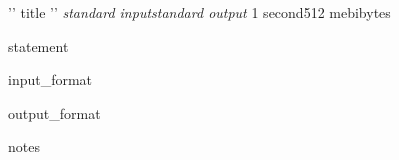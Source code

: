 \begin{problem}{{ '{' }}{{ title }}{{ '}' }}
{\textsl{standard input}}{\textsl{standard output}}
{1 second}{512 mebibytes}{}

{{ statement }}

\InputFile

{{ input_format }}

\OutputFile

{{ output_format }}

\Examples

\begin{example}\end{example}

{{ notes }}

\end{problem}
